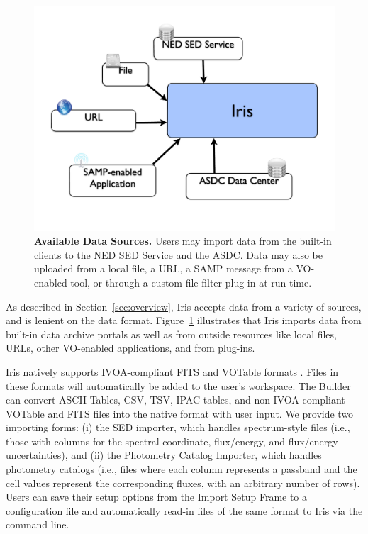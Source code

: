 \documentclass[preprint,authoryear,5p]{elsarticle}
\begin{document}
\begin{figure} \begin{center}
\includegraphics[width=\columnwidth]{IrisDiagrams.002.pdf}
\caption{\textbf{\label{fig:data_sources} Available Data
Sources.}  Users may import data from the built-in
clients to the NED SED Service and the ASDC. Data may also be uploaded from 
a local file, a URL, a SAMP message from a VO-enabled tool, 
or through a custom file filter plug-in at run time.} \end{center}
\end{figure}

As described in Section~\ref{sec:overview}, Iris accepts data from a variety of
sources, and is lenient on the data format. Figure~\ref{fig:data_sources}
illustrates that Iris imports data from built-in data archive portals as well as
from outside resources like local files, URLs, other VO-enabled applications,
and from plug-ins.

Iris natively supports IVOA-compliant FITS and VOTable formats
\citep{2012arXiv1204.3055M}. Files in these formats will automatically be added
to the user's workspace. The Builder can convert ASCII Tables, CSV,
TSV, IPAC tables, and non IVOA-com\-pli\-ant VOTable and FITS files
into the native format with user input. We provide two importing forms: (i) the
SED importer, which handles spectrum-style files (i.e., those with columns for
the spectral coordinate, flux/energy, and flux/energy uncertainties), and (ii)
the Photometry Catalog Importer, which handles photometry catalogs (i.e., files
where each column represents a passband and the cell values represent the
corresponding fluxes, with an arbitrary number of rows). Users can save their
setup options from the Import Setup Frame to a configuration file and
automatically read-in files of the same format to Iris via the command line.
\end{document}
